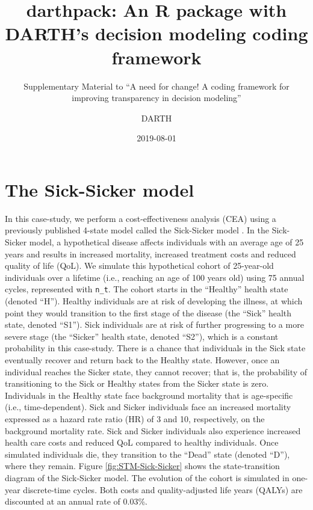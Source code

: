 \documentclass[]{book}
\title{darthpack: An R package with DARTH's decision modeling coding framework}
\subtitle{Supplementary Material to ``A need for change! A coding framework for improving transparency in decision modeling''}
\author{DARTH}
\date{2019-08-01}
\begin{document}
\maketitle

{
\setcounter{tocdepth}{1}
\tableofcontents
}
\hypertarget{the-sick-sicker-model}{%
\chapter*{The Sick-Sicker model}\label{the-sick-sicker-model}}

In this case-study, we perform a cost-effectiveness analysis (CEA) using a previously published 4-state model called the Sick-Sicker model \citep{Enns2015}. In the Sick-Sicker model, a hypothetical disease affects individuals with an average age of 25 years and results in increased mortality, increased treatment costs and reduced quality of life (QoL). We simulate this hypothetical cohort of 25-year-old individuals over a lifetime (i.e., reaching an age of 100 years old) using 75 annual cycles, represented with \texttt{n\_t}. The cohort starts in the ``Healthy'' health state (denoted ``H''). Healthy individuals are at risk of developing the illness, at which point they would transition to the first stage of the disease (the ``Sick'' health state, denoted ``S1''). Sick individuals are at risk of further progressing to a more severe stage (the ``Sicker'' health state, denoted ``S2''), which is a constant probability in this case-study. There is a chance that individuals in the Sick state eventually recover and return back to the Healthy state. However, once an individual reaches the Sicker state, they cannot recover; that is, the probability of transitioning to the Sick or Healthy states from the Sicker state is zero. Individuals in the Healthy state face background mortality that is age-specific (i.e., time-dependent). Sick and Sicker individuals face an increased mortality expressed as a hazard rate ratio (HR) of 3 and 10, respectively, on the background mortality rate. Sick and Sicker individuals also experience increased health care costs and reduced QoL compared to healthy individuals. Once simulated individuals die, they transition to the ``Dead'' state (denoted ``D''), where they remain. Figure \ref{fig:STM-Sick-Sicker} shows the state-transition diagram of the Sick-Sicker model. The evolution of the cohort is simulated in one-year discrete-time cycles. Both costs and quality-adjusted life years (QALYs) are discounted at an annual rate of 0.03\%.
\end{document}
